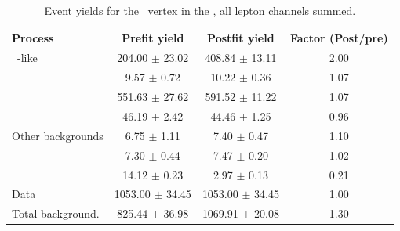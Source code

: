 \begin{table}[htbp]
	\centering
		\caption{Event yields for the \Zut\ vertex in the \WZCR,   all lepton channels summed. }
	
	\begin{tabular} {l c c c }
		\toprule
		Process & Prefit yield & Postfit yield & Factor (Post/pre) \\
		\midrule
		\NPL\ \DY-like & 204.00 $ \pm $ 23.02 & 408.84 $ \pm $ 13.11 & 2.00 \\ 
		\ttZ & 9.57 $ \pm $ 0.72 & 10.22 $ \pm $ 0.36 & 1.07 \\ 
		\WZ & 551.63 $ \pm $ 27.62 & 591.52 $ \pm $ 11.22 & 1.07 \\ 
		\ZZ & 46.19 $ \pm $ 2.42 & 44.46 $ \pm $ 1.25 & 0.96 \\ 
		Other backgrounds & 6.75 $ \pm $ 1.11 & 7.40 $ \pm $ 0.47 & 1.10 \\ 
		\tZq & 7.30 $ \pm $ 0.44 & 7.47 $ \pm $ 0.20 & 1.02 \\ 
		\kZut  & 14.12 $ \pm $ 0.23 & 2.97 $ \pm $ 0.13 & 0.21 \B \\
		\hdashline
		Data & 1053.00 $ \pm $ 34.45 & 1053.00 $ \pm $ 34.45 & 1.00 \T \\
		Total background. & 825.44 $ \pm $ 36.98 & 1069.91 $ \pm $ 20.08 & 1.30\\
		\bottomrule
	\end{tabular}
\end{table}
\cleardoublepage
